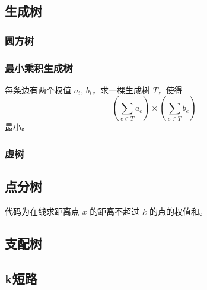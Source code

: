 \documentclass[../template.tex]{subfiles}
\begin{document}
\subsection{生成树}
\subsubsection{圆方树}
\subsubsection{最小乘积生成树}
每条边有两个权值 $a_i$, $b_i$，求一棵生成树 $T$，使得
\[
	\left(\sum_{e\in T}a_e\right)\times\left(\sum_{e\in T}b_e\right)
\]
最小。
\subsubsection{虚树}

\subsection{点分树}
代码为在线求距离点 $x$ 的距离不超过 $k$ 的点的权值和。

\subsection{支配树}


\subsection{k短路}
\end{document}
